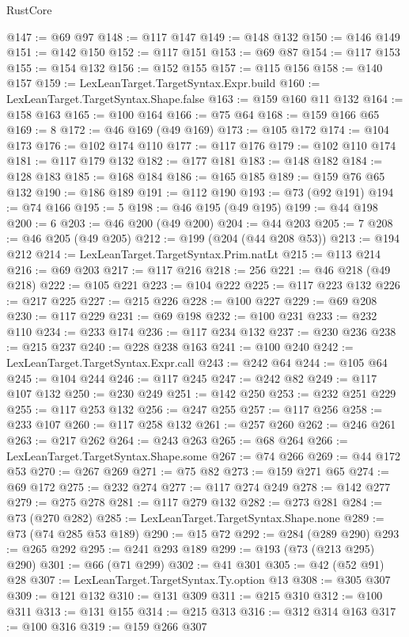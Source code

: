 \begin{lexlean}{RustCore}
\begin{coremodule}
@147 := @69 @97
@148 := @117 @147
@149 := @148 @132
@150 := @146 @149
@151 := @142 @150
@152 := @117 @151
@153 := @69 @87
@154 := @117 @153
@155 := @154 @132
@156 := @152 @155
@157 := @115 @156
@158 := @140 @157
@159 := LexLeanTarget.TargetSyntax.Expr.build
@160 := LexLeanTarget.TargetSyntax.Shape.false
@163 := @159 @160 @11 @132
@164 := @158 @163
@165 := @100 @164
@166 := @75 @64
@168 := @159 @166 @65
@169 := 8
@172 := @46 @169 (@49 @169)
@173 := @105 @172
@174 := @104 @173
@176 := @102 @174 @110
@177 := @117 @176
@179 := @102 @110 @174
@181 := @117 @179 @132
@182 := @177 @181
@183 := @148 @182
@184 := @128 @183
@185 := @168 @184
@186 := @165 @185
@189 := @159 @76 @65 @132
@190 := @186 @189
@191 := @112 @190
@193 := @73 (@92 @191)
@194 := @74 @166
@195 := 5
@198 := @46 @195 (@49 @195)
@199 := @44 @198
@200 := 6
@203 := @46 @200 (@49 @200)
@204 := @44 @203
@205 := 7
@208 := @46 @205 (@49 @205)
@212 := @199 (@204 (@44 @208 @53))
@213 := @194 @212
@214 := LexLeanTarget.TargetSyntax.Prim.natLt
@215 := @113 @214
@216 := @69 @203
@217 := @117 @216
@218 := 256
@221 := @46 @218 (@49 @218)
@222 := @105 @221
@223 := @104 @222
@225 := @117 @223 @132
@226 := @217 @225
@227 := @215 @226
@228 := @100 @227
@229 := @69 @208
@230 := @117 @229
@231 := @69 @198
@232 := @100 @231
@233 := @232 @110
@234 := @233 @174
@236 := @117 @234 @132
@237 := @230 @236
@238 := @215 @237
@240 := @228 @238 @163
@241 := @100 @240
@242 := LexLeanTarget.TargetSyntax.Expr.call
@243 := @242 @64
@244 := @105 @64
@245 := @104 @244
@246 := @117 @245
@247 := @242 @82
@249 := @117 @107 @132
@250 := @230 @249
@251 := @142 @250
@253 := @232 @251 @229
@255 := @117 @253 @132
@256 := @247 @255
@257 := @117 @256
@258 := @233 @107
@260 := @117 @258 @132
@261 := @257 @260
@262 := @246 @261
@263 := @217 @262
@264 := @243 @263
@265 := @68 @264
@266 := LexLeanTarget.TargetSyntax.Shape.some
@267 := @74 @266
@269 := @44 @172 @53
@270 := @267 @269
@271 := @75 @82
@273 := @159 @271 @65
@274 := @69 @172
@275 := @232 @274
@277 := @117 @274 @249
@278 := @142 @277
@279 := @275 @278
@281 := @117 @279 @132
@282 := @273 @281
@284 := @73 (@270 @282)
@285 := LexLeanTarget.TargetSyntax.Shape.none
@289 := @73 (@74 @285 @53 @189)
@290 := @15 @72
@292 := @284 (@289 @290)
@293 := @265 @292
@295 := @241 @293 @189
@299 := @193 (@73 (@213 @295) @290)
@301 := @66 (@71 @299)
@302 := @41 @301
@305 := @42 (@52 @91) @28
@307 := LexLeanTarget.TargetSyntax.Ty.option @13
@308 := @305 @307
@309 := @121 @132
@310 := @131 @309
@311 := @215 @310
@312 := @100 @311
@313 := @131 @155
@314 := @215 @313
@316 := @312 @314 @163
@317 := @100 @316
@319 := @159 @266 @307

\end{coremodule}
\end{lexlean}
